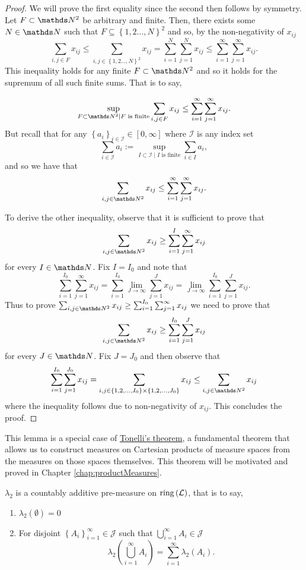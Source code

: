 \begin{proof}
We will prove the first equality since the second then follows by
symmetry. Let $F\subset\N^{2}$ be arbitrary and finite. Then, there
exists some $N\in\N$ such that $F\subseteq\left\{ 1,2\ldots,N\right\} ^{2}$
and so, by the non-negativity of $x_{ij}$
\[
\sum_{i,j\in F}x_{ij}\leq\sum_{i,j\in\left\{ 1,2\ldots,N\right\} ^{2}}x_{ij}=\sum_{i=1}^{N}\sum_{j=1}^{N}x_{ij}\leq\sum_{i=1}^{\infty}\sum_{j=1}^{\infty}x_{ij}.
\]
This inequality holds for any finite $F\subset\N^{2}$ and so it holds
for the supremum of all such finite sums. That is to say,

\[
\sup_{F\subset\N^{2}\mid F\text{ is finite}}\sum_{i,j\in F}x_{ij}\leq\sum_{i=1}^{\infty}\sum_{j=1}^{\infty}x_{ij}.
\]
But recall that for any $\left\{ a_{i}\right\} _{i\in\mathcal{I}}\in\left[0,\infty\right]$
where $\mathcal{I}$ is any index set
\[
\sum_{i\in\mathcal{I}}a_{i}:=\sup_{I\subset\mathcal{I}\mid I\text{ is finite}}\sum_{i\in I}a_{i},
\]
and so we have that
\[
\sum_{i,j\in\N^{2}}x_{ij}\leq\sum_{i=1}^{\infty}\sum_{j=1}^{\infty}x_{ij}.
\]

To derive the other inequality, observe that it is sufficient to prove
that
\[
\sum_{i,j\in\N^{2}}x_{ij}\geq\sum_{i=1}^{I}\sum_{j=1}^{\infty}x_{ij}
\]
for every $I\in\N$. Fix $I=I_{0}$ and note that
\[
\sum_{i=1}^{I_{0}}\sum_{j=1}^{\infty}x_{ij}=\sum_{i=1}^{I_{0}}\lim_{J\to\infty}\sum_{j=1}^{J}x_{ij}=\lim_{J\to\infty}\sum_{i=1}^{I_{0}}\sum_{j=1}^{J}x_{ij}.
\]
Thus to prove $\sum_{i,j\in\N^{2}}x_{ij}\geq\sum_{i=1}^{I_{0}}\sum_{j=1}^{\infty}x_{ij}$
we need to prove that 
\[
\sum_{i,j\in\N^{2}}x_{ij}\geq\sum_{i=1}^{I_{0}}\sum_{j=1}^{J}x_{ij}
\]
for every $J\in\N$. Fix $J=J_{0}$ and then observe that
\[
\sum_{i=1}^{I_{0}}\sum_{j=1}^{J_{0}}x_{ij}=\sum_{i,j\in\left\{ 1,2,\ldots,I_{0}\right\} \times\left\{ 1,2,\ldots,J_{0}\right\} }x_{ij}\leq\sum_{i,j\in\N^{2}}x_{ij}
\]
where the inequality follows due to non-negativity of $x_{ij}$. This
concludes the proof.
\end{proof}
\begin{rem*}
This lemma is a special case of \hyperref[thm:tonelli]{Tonelli's theorem},
a fundamental theorem that allows us to construct measures on Cartesian
products of measure spaces from the measures on those spaces themselves.
This theorem will be motivated and proved in Chapter \ref{chap:productMeasures}.
\end{rem*}
\begin{prop}
\label{prop:ringMeasureCountablyAdditive} $\lambda_{2}$ is a countably
additive pre-measure on $\mathrm{ring}\left(\mathcal{L}\right)$, that is
to say,

\begin{enumerate}[label=(\roman*),leftmargin=.1\linewidth,rightmargin=.4\linewidth]
	\item $\lambda_2\left(\emptyset\right) = 0$ 
	\item For disjoint $\left\{A_i\right\}_{i=1}^{\infty}\in \mathcal{J}$ such that $\bigcup_{i=1}^{\infty}A_i \in \mathcal{J}$
	\[
			\lambda_2\left(\bigcup_{i=1}^{\infty}A_i\right) = \sum_{i=1}^{\infty}\lambda_2\left(A_i\right).
	\]
\end{enumerate}
\end{prop}

